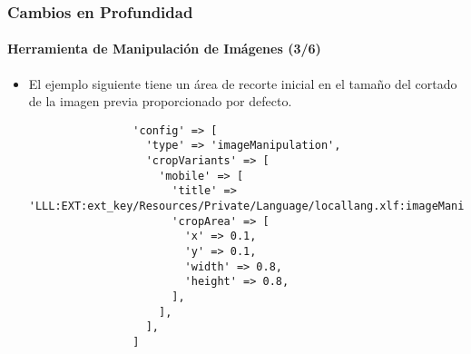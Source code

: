 
\begin{frame}[fragile]
	\frametitle{Cambios en Profundidad}
	\framesubtitle{Herramienta de Manipulación de Imágenes (3/6)}

	\lstset{basicstyle=\tiny\ttfamily}

	\begin{itemize}

		\item El ejemplo siguiente tiene un área de recorte inicial en el tamaño
			del cortado de la imagen previa proporcionado por defecto.

			\begin{lstlisting}
				'config' => [
				  'type' => 'imageManipulation',
				  'cropVariants' => [
				    'mobile' => [
				      'title' => 'LLL:EXT:ext_key/Resources/Private/Language/locallang.xlf:imageManipulation.mobile',
				      'cropArea' => [
				        'x' => 0.1,
				        'y' => 0.1,
				        'width' => 0.8,
				        'height' => 0.8,
				      ],
				    ],
				  ],
				]
			\end{lstlisting}

	\end{itemize}

\end{frame}


